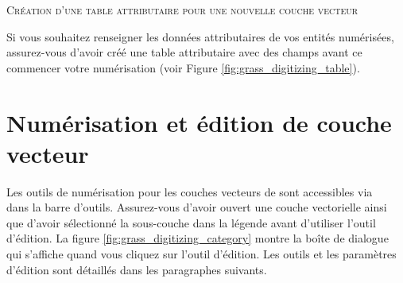 \begin{Tip}\caption{\textsc{Création d'une table attributaire pour une nouvelle couche vecteur \grass}}
Si vous souhaitez renseigner les données attributaires de vos entités numérisées, assurez-vous d'avoir créé une table attributaire avec des champs avant ce commencer votre numérisation (voir Figure \ref{fig:grass_digitizing_table}).
\end{Tip}

\section{Numérisation et édition de couche vecteur \grass}\label{grass_digitising}

Les outils de numérisation pour les couches vecteurs de \grass sont accessibles via\\  dans la barre d'outils. Assurez-vous d'avoir ouvert une couche vectorielle \grass ainsi que d'avoir sélectionné la sous-couche dans la légende avant d'utiliser l'outil d'édition. La figure \ref{fig:grass_digitizing_category} montre la boîte de dialogue \grass qui s'affiche quand vous cliquez sur l'outil d'édition. Les outils et les paramètres d'édition sont détaillés dans les paragraphes suivants.


